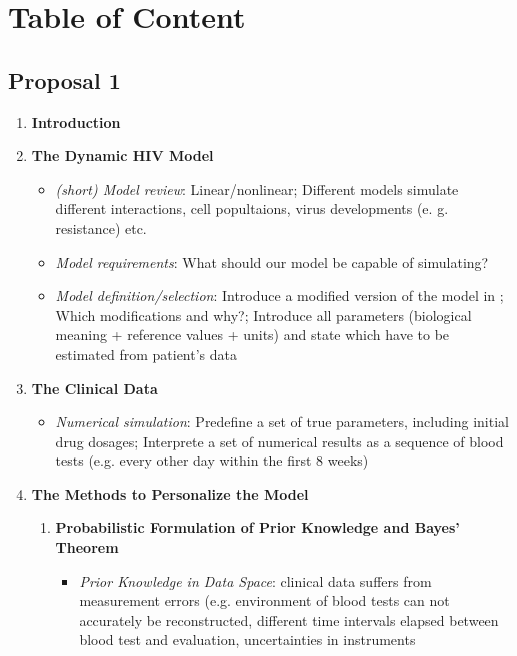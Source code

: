 \section*{Table of Content}
\subsection*{Proposal 1}

\begin{enumerate}[font=\bfseries]
    \item \textbf{Introduction}
    \item \textbf{The Dynamic HIV Model}
    \begin{itemize}[font=\small]
        \item \textit{(short) Model review}: Linear/nonlinear; Different models simulate different interactions, 
        cell popultaions, virus developments (e. g. resistance) etc.
        \item \textit{Model requirements}: What should our model be capable of simulating?
        \item \textit{Model definition/selection}: Introduce a modified version of the model in \cite{wu2010game}; 
        Which modifications and why?; Introduce all parameters (biological meaning + reference values \cite{adams2005hiv} + units) and state 
        which have to be estimated from patient's data \cite{callaway2002hiv}
    \end{itemize}
    \item \textbf{The Clinical Data}
    \begin{itemize}[font=\small]
        \item \textit{Numerical simulation}: Predefine a set of true parameters, including initial drug dosages; Interprete a set of numerical results as a sequence of blood 
        tests (e.g. every other day within the first 8 weeks)
    \end{itemize}
    \item \textbf{The Methods to Personalize the Model}
    \begin{enumerate}[font=\bfseries]
        \item \textbf{Probabilistic Formulation of Prior Knowledge and Bayes' Theorem}
        \begin{itemize}[font=\small]
            \item \textit{Prior Knowledge in Data Space}: clinical data suffers from measurement errors (e.g. environment of blood tests can 
            not accurately be reconstructed, different time intervals elapsed between blood test and evaluation, uncertainties in instruments 

\end{itemize}
\end{enumerate}
\end{enumerate}

